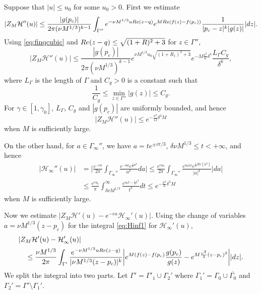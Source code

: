\documentclass[11pt]{article}
\begin{document}
Suppose that $|u|\le u_0$ for some $u_0>0$. First we estimate
\begin{equation}\label{eq:124}
  |Z_M\mathcal{H}''(u)|\le \frac{|g(p_c)|}{2\pi (\nu M^{1/3})^{k-1}}
  \int_{\Gamma''}
  e^{-\nu M^{1/3} u Re(z-q)} e^{M Re(f(z)-f(p_c))} \frac1{|p_c-z|^k|g(z)|} |dz|.
\end{equation}
Using \eqref{eq:finqcubic} and $Re(z-q) \le \sqrt{(1+R)^2+3}$
for $z\in \Gamma''$,
\begin{equation}\label{eq:125}
  |Z_M \mathcal{H}''(u)| \le \frac{|g(p_c)|}{2\pi (\nu M^{1/3})^{k-1}}
    e^{\nu M^{1/3}u_0 \sqrt{(1+R_1)^2+3}}
    e^{-M\frac{\nu^3}6 \delta^3} \frac{L_{\Gamma}C_g}{\delta^k},
\end{equation}
where $L_\Gamma$ is the length of $\Gamma$ and $C_g>0$ is a
constant such that
\begin{equation}
  \frac1{C_g} \le \min_{z\in\Gamma''} |g(z)| \le C_g.
\end{equation}
For $\gamma \in [1,\gamma_0]$, $L_\Gamma$, $C_g$ and $|g(p_c)|$
are uniformly bounded, and hence
\begin{equation}\label{eq:estucomp1}
  | Z_M \mathcal{H}''(u)| \le e^{-\frac{\nu^3}{12} \delta^3 M}
\end{equation}
when $M$ is sufficiently large.

On the other hand, for $a\in \Gamma_\infty''$,
we have $a=t e^{\pm i\pi/3}$,
$\delta\nu M^{1/3} \le t <+\infty$, and hence
\begin{equation}\label{eq:estucomp2}
\begin{split}
  | \mathcal{H}_{\infty}''(u) |
  & = \biggl| \frac{e^{-\epsilon u}}{2\pi} \int_{\Gamma_\infty''}
  \frac{e^{-ua} e^{\frac13 a^3}}{a^k} da \biggr|
  \le \frac{e^{\epsilon u_0}}{2\pi} \int_{\Gamma_{\infty}''}
  \frac{e^{u_0 |a|} e^{\frac13 Re(a^3)}}{|a|^k} |da|  \\
  &\le \frac{e^{\epsilon u_0}}{\pi} \int_{\delta\nu M^{1/3}}^\infty
  \frac{e^{u_0t-\frac13 t^3} }{t^k} dt
  \le e^{-\frac{\nu^3}{6}\delta^3M}
\end{split}
\end{equation}
when $M$ is sufficiently large.

Now we estimate
$| Z_M \mathcal{H}'(u) - e^{-\epsilon u}\mathcal{H}_\infty'(u) |$. Using the change of
variables $a=\nu M^{1/3}(z-p_c)$ for the integral \eqref{eq:Hinf1} for $\mathcal{H}_\infty'(u)$,
\begin{equation}\label{eq:Htemppart}
\begin{split}
  &| Z_M \mathcal{H}'(u) - \mathcal{H}_\infty'(u) | \\
&\quad \le \frac{\nu M^{1/3}}{2\pi} \int_{\Gamma'} \frac{e^{-\nu
M^{1/3} uRe(z-q)}}{|\nu M^{1/3}(z-p_c)|^k} \biggl|
e^{M(f(z)-f(p_c)} \frac{g(p_c)}{g(z)} - e^{M\frac{\nu^3}3
(z-p_c)^3} \biggr| |dz|.
\end{split}
\end{equation}
We split the integral into two parts. Let
$\Gamma'=\Gamma'_1\cup\Gamma_2'$ where
$\Gamma_1'=\Gamma_0\cup\overline{\Gamma_0}$ and
$\Gamma_2'=\Gamma'\setminus\Gamma_1'$.
\end{document}
